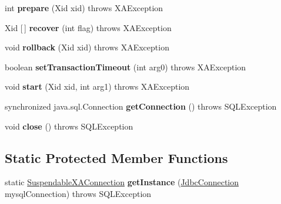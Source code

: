 \begin{DoxyCompactItemize}
int {\bfseries prepare} (Xid xid)  throws X\+A\+Exception 
\item 
\mbox{\label{classcom_1_1mysql_1_1cj_1_1jdbc_1_1_suspendable_x_a_connection_ac136b715627473b77b2668485a189dad}} 
Xid \mbox{[}$\,$\mbox{]} {\bfseries recover} (int flag)  throws X\+A\+Exception 
\item 
\mbox{\label{classcom_1_1mysql_1_1cj_1_1jdbc_1_1_suspendable_x_a_connection_a9167b090a36d780e18fc699e0aa2cbcb}} 
void {\bfseries rollback} (Xid xid)  throws X\+A\+Exception 
\item 
\mbox{\label{classcom_1_1mysql_1_1cj_1_1jdbc_1_1_suspendable_x_a_connection_a9e5215a340c576da77edd4f523bfb71e}} 
boolean {\bfseries set\+Transaction\+Timeout} (int arg0)  throws X\+A\+Exception 
\item 
\mbox{\label{classcom_1_1mysql_1_1cj_1_1jdbc_1_1_suspendable_x_a_connection_a8d0fbd3c10412c014ba642b955435d8c}} 
void {\bfseries start} (Xid xid, int arg1)  throws X\+A\+Exception 
\item 
\mbox{\label{classcom_1_1mysql_1_1cj_1_1jdbc_1_1_suspendable_x_a_connection_a1a7f46f44b6433f57b5126ba6879f7d4}} 
synchronized java.\+sql.\+Connection {\bfseries get\+Connection} ()  throws S\+Q\+L\+Exception 
\item 
\mbox{\label{classcom_1_1mysql_1_1cj_1_1jdbc_1_1_suspendable_x_a_connection_ae22f87e04caefd066bf411f203a7ff5c}} 
void {\bfseries close} ()  throws S\+Q\+L\+Exception 
\end{DoxyCompactItemize}
\subsection*{Static Protected Member Functions}
\begin{DoxyCompactItemize}
\item 
\mbox{\label{classcom_1_1mysql_1_1cj_1_1jdbc_1_1_suspendable_x_a_connection_aa201aea08292a81433d1061bfa4eef15}} 
static \mbox{\hyperlink{classcom_1_1mysql_1_1cj_1_1jdbc_1_1_suspendable_x_a_connection}{Suspendable\+X\+A\+Connection}} {\bfseries get\+Instance} (\mbox{\hyperlink{interfacecom_1_1mysql_1_1cj_1_1jdbc_1_1_jdbc_connection}{Jdbc\+Connection}} mysql\+Connection)  throws S\+Q\+L\+Exception 
\end{DoxyCompactItemize}
